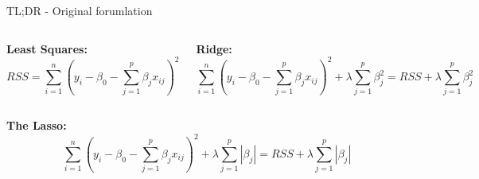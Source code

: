 \documentclass[aspectratio=169,usenames,dvipsnames]{beamer}
\begin{document}
\begin{frame}[c]{TL;DR - Original forumlation}

	\begin{columns}
	\centering
	\textbf{Least Squares:}
	\footnotesize
	\begin{equation*}
		RSS = \sum_{i=1}^n \left(y_i - \beta_0 - \sum_{j=1}^p \beta_j x_{ij}\right)^2
	\end{equation*}
	
	\centering
	\textbf{Ridge:}
	\footnotesize
	\begin{equation*}
		\sum_{i=1}^n \left(y_i - \beta_0 - \sum_{j=1}^p \beta_j x_{ij}\right)^2 + \lambda \sum_{j=1}^p \beta_j^2 = RSS + \lambda \sum_{j=1}^p \beta_j^2
	\end{equation*}
	
	\end{columns}
	\centering
	
	\vspace{.2in}
	
	\textbf{The Lasso:}
	\footnotesize
	\begin{equation*}
		\sum_{i=1}^n \left(y_i - \beta_0 - \sum_{j=1}^p \beta_j x_{ij}\right)^2
			+ \lambda \sum_{j=1}^p |\beta_j|
		= RSS + \lambda \sum_{j=1}^p |\beta_j|
	\end{equation*}
	
	
	\end{frame}
	
	
	
	
	
	
\end{document}
